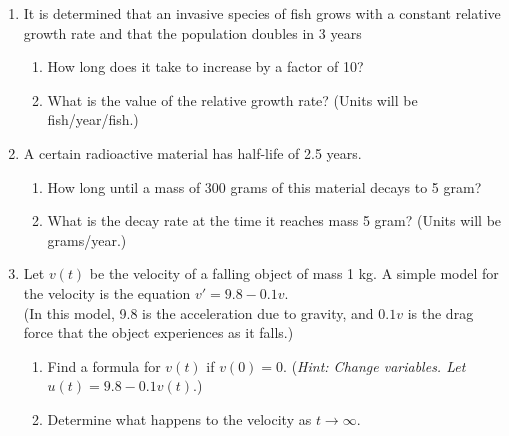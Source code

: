 \documentclass[11pt]{article}
\begin{document}
\begin{enumerate}
\item{It is determined that an invasive species of fish grows with a constant relative growth rate and that the population doubles in 3 years
\begin{enumerate}
\item{How long does it take to increase by a factor of 10?  }
\item{What is the value of the relative growth rate?  (Units will be fish/year/fish.)}
\end{enumerate}
}

\item{A certain radioactive material has half-life of 2.5 years. 
\begin{enumerate}
\item{How long until a mass of 300 grams of this material decays to 5 gram?}
\item{What is the decay rate at the time it reaches mass 5 gram? (Units will be grams/year.)}
\end{enumerate}
}

\item{Let $v(t)$ be the velocity of a falling object of mass 1 kg.  A simple model for the velocity is the equation $v' = 9.8 - 0.1v$.
  \\ (In this model, 9.8 is the acceleration due to gravity, and $0.1v$ is the drag force that the object experiences as it falls.)
\begin{enumerate}
\item{Find a formula for  $v(t)$ if $v(0)=0$.  (\emph{Hint:  Change variables.  Let $u(t) = 9.8-0.1v(t)$}.) }
\item{Determine what happens to the velocity as $t\to\infty$.}
\end{enumerate}

}
\end{enumerate}
\end{document}
